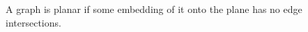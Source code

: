 
\begin{definition}[Planarity]
    A graph is planar if some embedding of it onto the plane has no edge intersections.
\end{definition}

